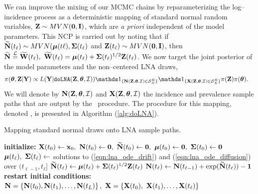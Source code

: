 We can improve the mixing of our MCMC chains by reparameterizing the log--incidence process as a deterministic mapping of standard normal random variables, $ \mathbf{Z}\sim MVN(\boldsymbol{0},\mathbf{I}) $, which are \textit{a priori} independent of the model parameters. This NCP is carried out by noting that if $ \widetilde{\mathbf{N}}(t_\ell)\sim MVN(\boldsymbol{\mu}(t\ell),\boldsymbol{\Sigma}(t_\ell) $ and $ \mathbf{Z}(t_\ell)\sim MVN(\boldsymbol{0},\mathbf{I}) $, then $ \widetilde{\mathbf{N}} \overset{\mathcal{L}}{=}\widetilde{\mathbf{W}}(t_\ell),\ \widetilde{\mathbf{W}}(t_\ell) = \boldsymbol{\mu}(t_\ell) + \boldsymbol{\Sigma}(t_\ell)^{1/2}\mathbf{Z}(t_\ell) $. We now target the joint posterior of the model parameters and the non--centered LNA draws,
\begin{align}
\label{eqn:lna_noncentered_posterior}
\pi(\btheta,\bZ|\bY) &\propto L(\bY|\doLNA(\bZ,\btheta,\mcI))\ind{\bN(\bZ,\btheta,\mcI)\in\mcS_N^R}\ind{\bX(\bZ,\btheta,\mcI)\in\mcS_X^R}\pi(\bZ)\pi(\btheta).
\end{align}
We will denote by $ \mathbf{N}(\mathbf{Z},\boldsymbol{\theta},\mathcal{I}) $ and $ \mathbf{X}(\mathbf{Z},\boldsymbol{\theta},\mathcal{I}) $ the incidence and prevalence sample paths that are output by the \doLNA\ procedure. The procedure for this mapping, denoted \doLNA, is presented in Algorithm (\ref{alg:doLNA}). 
\begin{algorithm}[h!]
	\caption{Mapping standard normal draws onto LNA sample paths.}
	\label{alg:doLNA}
	\begin{algorithmic}[1]
		\State \textbf{initialize: }$ \bX(t_0) \gets \bx_0,\ \bN(t_0) \gets \bs{0},\ \bNtil(t_0) \gets \bs{0},\ \bmu(t_0) \gets \bs{0},\ \bSigma(t_0) \gets \bs{0} $
		\State $ \boldsymbol{\mu}(t_\ell),\ \boldsymbol{\Sigma}(t_\ell) \gets $ solutions to (\ref{eqn:lna_ode_drift}) and (\ref{eqn:lna_ode_diffusion}) over $ (t_{\ell-1}, t_\ell] $
		\State $ \widetilde{\mathbf{N}}(t_\ell)\gets \boldsymbol{\mu}(t_\ell) + \boldsymbol{\Sigma}(t_\ell)^{1/2}\mathbf{Z}(t_\ell) $ 
		\State $ \mathbf{N}(t_\ell)\gets \mathbf{N}(t_{\ell-1}) + \exp(\widetilde{\mathbf{N}}(t_\ell)) - \boldsymbol{1} $
		\State \textbf{restart initial conditions:} 
		\EndFor
		\State \hspace{-0.25in}\Return {}
		\State$\mathbf{N} = \left \lbrace\mathbf{N}(t_0),\mathbf{N}(t_1),\dots,\mathbf{N}(t_L)\right \rbrace,\ \mathbf{X} = \left \lbrace \mathbf{X}(t_0),\ \mathbf{X}(t_1),\dots,\mathbf{X}(t_\ell) \right \rbrace $
		\EndProcedure
	\end{algorithmic}
\end{algorithm}

